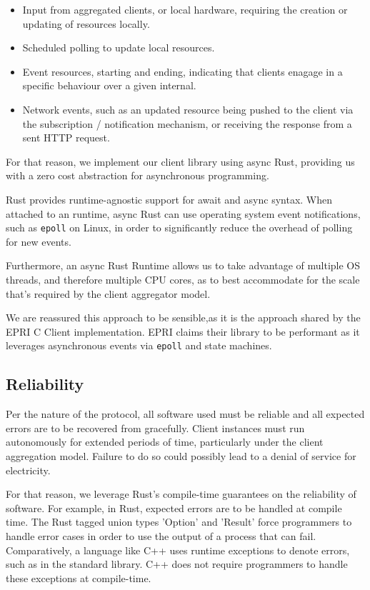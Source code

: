 \begin{itemize}
    \item Input from aggregated clients, or local hardware, requiring the creation or updating of resources locally.
    \item Scheduled polling to update local resources.
    \item Event resources, starting and ending, indicating that clients enagage in a specific behaviour over a given internal.
    \item Network events, such as an updated resource being pushed to the client via the subscription / notification mechanism, or receiving the response from a sent HTTP request.
\end{itemize}

For that reason, we implement our client library using async Rust, providing us with a zero cost abstraction for asynchronous programming.

Rust provides runtime-agnostic support for await and async syntax.
When attached to an runtime, async Rust can use operating system event notifications, such as \texttt{epoll} on Linux, in order to significantly reduce the overhead of polling for new events.

Furthermore, an async Rust Runtime allows us to take advantage of multiple OS threads, and therefore multiple CPU cores, as to best accommodate for the scale that's required by the client aggregator model.

We are reassured this approach to be sensible,as it is the approach shared by the EPRI C Client implementation. EPRI claims their library to be performant as it leverages asynchronous events via \texttt{epoll} and state machines.


\subsection{Reliability}
Per the nature of the protocol, all software used must be reliable and all expected errors are to be recovered from gracefully. Client instances must run autonomously for extended periods of time, particularly under the client aggregation model. Failure to do so could possibly lead to a denial of service for electricity.

For that reason, we leverage Rust's compile-time guarantees on the reliability of software. For example, in Rust, expected errors are to be handled at compile time. The Rust tagged union types 'Option' and 'Result' force programmers to handle error cases in order to use the output of a process that can fail. Comparatively, a language like C++ uses runtime exceptions to denote errors, such as in the standard library. C++ does not require programmers to handle these exceptions at compile-time.

